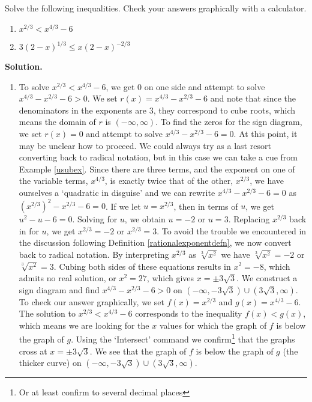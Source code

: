 \documentclass[12pt]{ximera}
\begin{document}
\begin{example}  Solve the following inequalities.  Check your answers graphically with a calculator.

\begin{multicols}{2}
\begin{enumerate}

\item $x^{2/3} < x^{4/3} - 6$

\item  $3 (2-x)^{1/3} \leq x (2-x)^{-2/3}$

\end{enumerate}
\end{multicols}

{\bf Solution.}  

\begin{enumerate}

\item  To solve $x^{2/3} < x^{4/3} - 6$, we get $0$ on one side and attempt to solve $x^{4/3} - x^{2/3} - 6 > 0$.  We set $r(x) = x^{4/3} - x^{2/3} - 6$ and note that since the denominators in the exponents are $3$, they correspond to cube roots, which means the domain of $r$ is $(-\infty, \infty)$. To find the zeros for the sign diagram, we set $r(x) = 0$ and attempt to solve $x^{4/3} - x^{2/3} - 6 = 0$.  At this point, it may be unclear how to proceed.  We could always try as a last resort converting back to radical notation,  but in this case we can take a cue from Example \ref{usubex}.  Since there are three terms, and the exponent on one of the variable terms, $x^{4/3}$, is exactly twice that of the other, $x^{2/3}$, we have ourselves a `quadratic in disguise' and we can rewrite  $ x^{4/3} - x^{2/3} - 6 = 0$ as $\left(x^{2/3}\right)^2 - x^{2/3} - 6=0$.  If we let $u = x^{2/3}$, then in terms of $u$, we get $u^2 - u - 6 = 0$.  Solving for $u$, we obtain $u = -2$ or $u = 3$.  Replacing $x^{2/3}$ back in for $u$, we get $x^{2/3} = -2$ or $x^{2/3} = 3$.  To avoid the trouble we encountered in the discussion following Definition \ref{rationalexponentdefn}, we now convert back to radical notation.  By interpreting $x^{2/3}$ as $\sqrt[3]{x^2}$ we have $\sqrt[3]{x^2} = -2$ or $\sqrt[3]{x^2}= 3$.  Cubing both sides of these equations results in $x^2 = -8$, which admits no real solution, or $x^2 = 27$, which gives $x = \pm 3 \sqrt{3}$.  We construct a sign diagram and find $x^{4/3} - x^{2/3} - 6 > 0$ on $\left(-\infty, -3 \sqrt{3}\right)\cup \left(3 \sqrt{3}, \infty\right)$.  To check our answer graphically, we set $f(x) = x^{2/3}$ and $g(x) = x^{4/3}-6$.  The solution to  $x^{2/3} < x^{4/3} - 6$ corresponds to the inequality $f(x) < g(x)$, which means we are looking for the $x$ values for which the graph of $f$ is below the graph of $g$.  Using the `Intersect' command we confirm\footnote{Or at least confirm to several decimal places} that the graphs cross at $x= \pm 3\sqrt{3}$.  We see that the graph of $f$ is below the graph of $g$ (the thicker curve) on $\left(-\infty, -3 \sqrt{3}\right)\cup \left(3 \sqrt{3}, \infty\right)$.


\end{enumerate}
\end{example}
\end{document}
